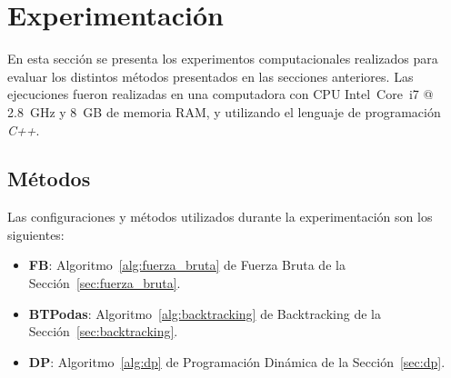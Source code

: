 \documentclass[10pt,a4paper]{article}
\begin{document}
\section{Experimentación} \label{sec:experimentacion}
En esta sección se presenta los experimentos computacionales realizados para evaluar los distintos métodos presentados en las secciones anteriores. Las ejecuciones fueron realizadas en una computadora con CPU Intel~Core~i7 @ 2.8~GHz y 8~GB de memoria RAM, y utilizando el lenguaje de programación \emph{C++}.

\subsection{Métodos}
Las configuraciones y métodos utilizados durante la experimentación son los siguientes:
\begin{itemize}
    \setlength{\itemsep}{1pt}
    \setlength{\parskip}{0pt}
    \setlength{\parsep}{0pt}
    \item \textbf{FB}: Algoritmo~\ref{alg:fuerza_bruta} de Fuerza Bruta de la Sección~\ref{sec:fuerza_bruta}.
    \item \textbf{BTPodas}: Algoritmo~\ref{alg:backtracking} de Backtracking de la Sección~\ref{sec:backtracking}.
    \item \textbf{DP}: Algoritmo~\ref{alg:dp} de Programación Dinámica de la Sección~\ref{sec:dp}.
\end{itemize}
\end{document}
